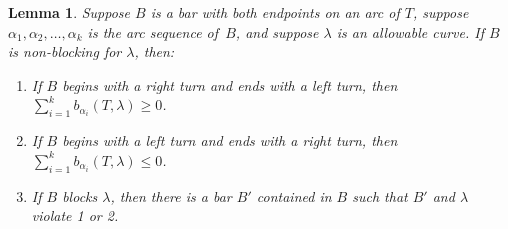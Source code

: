\documentclass{amsart}
\newtheorem{lemma}[proposition]{Lemma}
\theoremstyle{definition}
\theoremstyle{remark}
\numberwithin{equation}{section}
\newcommand{\0}{{\mathbf{0}}}
\begin{document}
\begin{lemma}\label{bar ineq}
Suppose $B$ is a bar with both endpoints on an arc of $T$, suppose $\alpha_1, \alpha_2,\ldots,\alpha_k$ is the arc sequence of~$B$, and suppose $\lambda$ is an allowable curve.
If $B$ is non-blocking for $\lambda$, then:
\begin{enumerate}[\qquad\rm\bf1.]
\item If $B$ begins with a right turn and ends with a left turn, then ${\sum_{i=1}^kb_{\alpha_i}(T,\lambda)\ge0}$.
\item If $B$ begins with a left turn and ends with a right turn, then ${\sum_{i=1}^kb_{\alpha_i}(T,\lambda)\le0}$.
\item
If $B$ blocks $\lambda$, then there is a bar $B'$ contained in $B$ such that $B'$ and $\lambda$ violate 1 or 2.
\end{enumerate}
\end{lemma}
\end{document}
